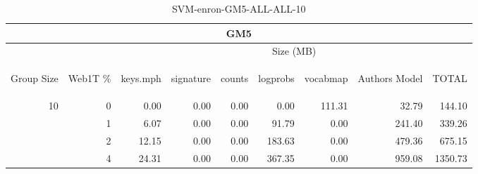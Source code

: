 \begin{center}
\begin{table}[htbp] 
 \begin{center}
\begin{tabular}{ | r | r | r | r | r | r | r | r | r |}
\hline
\multicolumn{9}{|c|}{GM5}\\
\hline
 & & \multicolumn{7}{|c|}{Size (MB)}\\ \cline{3-9}
\begin{sideways}Group Size\end{sideways} & \begin{sideways}Web1T \% \end{sideways} & \begin{sideways}keys.mph\end{sideways} & \begin{sideways}signature\end{sideways} & \begin{sideways}counts\end{sideways} & \begin{sideways}logprobs\end{sideways} & \begin{sideways}vocabmap\end{sideways} & \begin{sideways}Authors Model \end{sideways} & \begin{sideways}TOTAL\end{sideways}\\
\hline
\multirow{3}{*}{10}
 & 0 & 0.00 & 0.00 & 0.00 & 0.00 & 111.31 & 32.79 & 144.10\\ \cline{2-9}
 & 1 & 6.07 & 0.00 & 0.00 & 91.79 & 0.00 & 241.40 & 339.26\\ \cline{2-9}
 & 2 & 12.15 & 0.00 & 0.00 & 183.63 & 0.00 & 479.36 & 675.15\\ \cline{2-9}
 & 4 & 24.31 & 0.00 & 0.00 & 367.35 & 0.00 & 959.08 & 1350.73\\ \cline{2-9}
\hline
\end{tabular}
\caption{SVM-enron-GM5-ALL-ALL-10}
\label{table:SVM-enron-GM5-ALL-ALL-10}
\end{center}
 \end{table}
\end{center}


